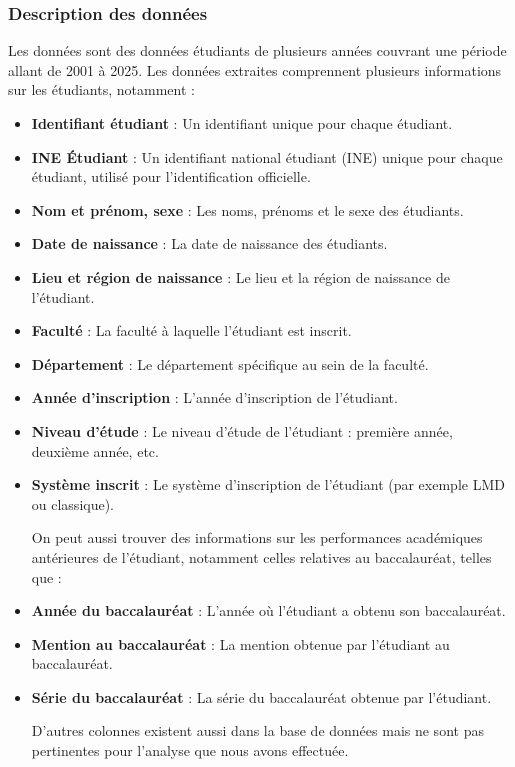 \subsubsection{Description des données} 
Les données sont des données étudiants de plusieurs années couvrant une période allant de 2001 à 2025.  
Les données extraites comprennent plusieurs informations sur les étudiants, notamment :
\begin{itemize}
    \item \textbf{Identifiant étudiant} : Un identifiant unique pour chaque étudiant. 
    \item \textbf{INE Étudiant} : Un identifiant national étudiant (INE) unique pour chaque étudiant, utilisé pour l'identification officielle.
    \item \textbf{Nom et prénom, sexe} : Les noms, prénoms et le sexe des étudiants.
    \item \textbf{Date de naissance} : La date de naissance des étudiants.
    \item \textbf{Lieu et région de naissance} : Le lieu et la région de naissance de l'étudiant.
    \item \textbf{Faculté} : La faculté à laquelle l'étudiant est inscrit.
    \item \textbf{Département} : Le département spécifique au sein de la faculté.
    \item \textbf{Année d'inscription} : L'année d'inscription de l'étudiant.
    \item \textbf{Niveau d'étude} : Le niveau d'étude de l'étudiant : première année, deuxième année, etc.
    \item \textbf{Système inscrit} : Le système d'inscription de l'étudiant (par exemple LMD ou classique). 
    
    On peut aussi trouver des informations sur les performances académiques antérieures de l'étudiant, notamment celles relatives au baccalauréat, telles que :
    \item \textbf{Année du baccalauréat} : L'année où l'étudiant a obtenu son baccalauréat.
    \item \textbf{Mention au baccalauréat} : La mention obtenue par l'étudiant au baccalauréat.
    \item \textbf{Série du baccalauréat} : La série du baccalauréat obtenue par l'étudiant.
    
    D'autres colonnes existent aussi dans la base de données mais ne sont pas pertinentes pour l'analyse que nous avons effectuée. 
    

\end{itemize}
